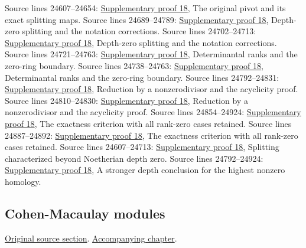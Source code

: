 \begin{AlgebraSourceRoutes}
 Source lines 24607--24654: \hyperlink{algebra_complex_exactness_notes_20260928}{Supplementary proof 18}, The original pivot and its exact splitting maps.
 Source lines 24689--24789: \hyperlink{algebra_complex_exactness_notes_20260928}{Supplementary proof 18}, Depth-zero splitting and the notation corrections.
 Source lines 24702--24713: \hyperlink{algebra_complex_exactness_notes_20260928}{Supplementary proof 18}, Depth-zero splitting and the notation corrections.
 Source lines 24721--24763: \hyperlink{algebra_complex_exactness_notes_20260928}{Supplementary proof 18}, Determinantal ranks and the zero-ring boundary.
 Source lines 24738--24763: \hyperlink{algebra_complex_exactness_notes_20260928}{Supplementary proof 18}, Determinantal ranks and the zero-ring boundary.
 Source lines 24792--24831: \hyperlink{algebra_complex_exactness_notes_20260928}{Supplementary proof 18}, Reduction by a nonzerodivisor and the acyclicity proof.
 Source lines 24810--24830: \hyperlink{algebra_complex_exactness_notes_20260928}{Supplementary proof 18}, Reduction by a nonzerodivisor and the acyclicity proof.
 Source lines 24854--24924: \hyperlink{algebra_complex_exactness_notes_20260928}{Supplementary proof 18}, The exactness criterion with all rank-zero cases retained.
 Source lines 24887--24892: \hyperlink{algebra_complex_exactness_notes_20260928}{Supplementary proof 18}, The exactness criterion with all rank-zero cases retained.
 Source lines 24607--24713: \hyperlink{algebra_complex_exactness_notes_20260928}{Supplementary proof 18}, Splitting characterized beyond Noetherian depth zero.
 Source lines 24792--24924: \hyperlink{algebra_complex_exactness_notes_20260928}{Supplementary proof 18}, A stronger depth conclusion for the highest nonzero homology.
\end{AlgebraSourceRoutes}

\subsection{Cohen-Macaulay modules}
\hypertarget{algebra-source-section-CM}{}
\noindent\href{https://github.com/stacks/stacks-project/blob/a04446e57ec1fbc252a871afcec7752fb2807b14/algebra.tex\#L24952}{Original source section}. \href{algebra.pdf\#nameddest=section-CM}{Accompanying chapter}.

